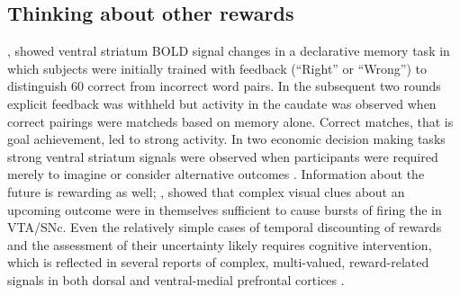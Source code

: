 \documentclass[doc,12pt]{apa}        %
\begin{document}
\subsection{Thinking about other rewards} %
\label{sub:other_cognitive_rewards}

, showed ventral striatum BOLD signal changes in a declarative memory task in which subjects were initially trained with feedback (``Right'' or ``Wrong'') to distinguish 60 correct from incorrect word pairs.  In the subsequent two rounds explicit feedback was withheld but activity in the caudate was observed when correct pairings were matcheds based on memory alone.  Correct matches, that is goal achievement, led to strong activity.  In two economic decision making tasks strong ventral striatum signals were observed when participants were required merely to imagine or consider alternative outcomes  \cite{Hayden:2009p6545,Lohrenz:2007p7240}.  Information about the future is rewarding as well; , showed that complex visual clues about an upcoming outcome were in themselves sufficient to cause bursts of firing the in VTA/SNc.  Even the relatively simple cases of temporal discounting of rewards and the assessment of their uncertainty likely requires cognitive intervention, which is reflected in several reports of complex, multi-valued, reward-related signals in both dorsal and ventral-medial prefrontal cortices \cite{Tobler:2009p8302,Wallis:2010p8303,Kim:2009p8304,Seymour:2008p6518}.
\end{document}
